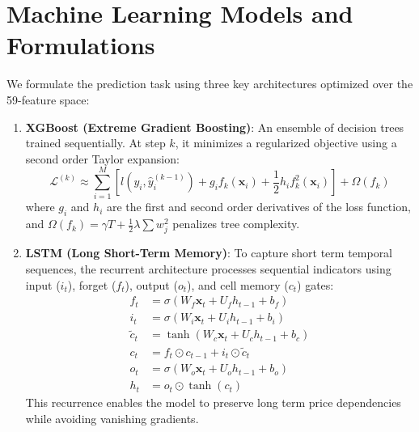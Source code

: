 \documentclass[11pt]{article}
\begin{document}
\section{Machine Learning Models and Formulations}
We formulate the prediction task using three key architectures optimized over the 59-feature space:
\begin{enumerate}
    \item \textbf{XGBoost (Extreme Gradient Boosting)}:
    An ensemble of decision trees trained sequentially. At step $k$, it minimizes a regularized objective using a second order Taylor expansion:
    \begin{equation}
        \mathcal{L}^{(k)} \approx \sum_{i=1}^{M} \left[ l(y_i, \hat{y}_i^{(k-1)}) + g_i f_k(\mathbf{x}_i) + \frac{1}{2} h_i f_k^2(\mathbf{x}_i) \right] + \Omega(f_k)
    \end{equation}
    where $g_i$ and $h_i$ are the first and second order derivatives of the loss function, and $\Omega(f_k) = \gamma T + \frac{1}{2}\lambda \sum w_j^2$ penalizes tree complexity.
    
    \item \textbf{LSTM (Long Short-Term Memory)}:
    To capture short term temporal sequences, the recurrent architecture processes sequential indicators using input ($i_t$), forget ($f_t$), output ($o_t$), and cell memory ($c_t$) gates:
    \begin{align}
        f_t &= \sigma(W_f \mathbf{x}_t + U_f h_{t-1} + b_f) \\
        i_t &= \sigma(W_i \mathbf{x}_t + U_i h_{t-1} + b_i) \\
        \tilde{c}_t &= \tanh(W_c \mathbf{x}_t + U_c h_{t-1} + b_c) \\
        c_t &= f_t \odot c_{t-1} + i_t \odot \tilde{c}_t \\
        o_t &= \sigma(W_o \mathbf{x}_t + U_o h_{t-1} + b_o) \\
        h_t &= o_t \odot \tanh(c_t)
    \end{align}
    This recurrence enables the model to preserve long term price dependencies while avoiding vanishing gradients.
    

\end{enumerate}
\end{document}
